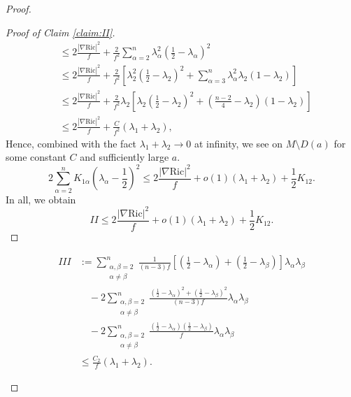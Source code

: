 \documentclass[10pt,a4paper]{amsart}
\begin{document}
\begin{proof}
\begin{proof}[Proof of Claim \ref{claim:II}]
\begin{equation}
\begin{aligned}
			&\leq 2\frac{|\nabla \mathrm{Ric}|^2}{f} + \frac{2}{f^2}\sum_{\alpha=2}^n\lambda_\alpha^2\left(\frac{1}{2} - \lambda_\alpha\right)^2 \\
			&\leq 2\frac{|\nabla \mathrm{Ric}|^2}{f} + \frac{2}{f^2}\left[\lambda_2^2\left(\frac{1}{2} - \lambda_2\right)^2 + \sum_{\alpha=3}^n\lambda_\alpha^2\lambda_2(1-\lambda_2)\right] \\
			&\leq 2\frac{|\nabla \mathrm{Ric}|^2}{f} + \frac{2}{f^2}\lambda_2\left[\lambda_2\left(\frac{1}{2} - \lambda_2\right)^2 + \left(\frac{n-2}{4} - \lambda_2\right)(1-\lambda_2)\right] \\
			&\leq 2\frac{|\nabla \mathrm{Ric}|^2}{f} + \frac{C}{f^2}(\lambda_1+\lambda_2),
		\end{aligned}
	\end{equation}
Hence, combined with the fact $\lambda_1+\lambda_2 \to 0$ at infinity, we see
		on $M \setminus D(a)$ for some constant $C$ and sufficiently large $a$.
		\[
	2\sum_{\alpha=2}^n K_{1\alpha}\left(\lambda_\alpha - \frac{1}{2}\right)^2 \leq 2\frac{|\nabla \mathrm{Ric}|^2}{f} + o(1)(\lambda_1+\lambda_2) + \frac{1}{2}K_{12}.	
		\]%
		In all, we obtain
		\[
		II \leq 2\frac{|\nabla \mathrm{Ric}|^2}{f} + o(1)(\lambda_1+\lambda_2) + \frac{1}{2}K_{12}.
		\]
	\end{proof}
	
	\begin{claim}\label{claim:III}
		\begin{equation*}\label{eq:claim-III}
			\begin{aligned}
				III &:= \sum_{\substack{\alpha,\beta=2 \\ \alpha\neq\beta}}^n \frac{1}{(n-3)f}\left[\left(\frac{1}{2} - \lambda_{\alpha}\right) + \left(\frac{1}{2} - \lambda_{\beta}\right)\right]\lambda_\alpha\lambda_\beta \\
				&\quad - 2\sum_{\substack{\alpha,\beta=2 \\ \alpha\neq\beta}}^n \frac{\left(\frac{1}{2} - \lambda_{\alpha}\right)^2 + \left(\frac{1}{2} - \lambda_{\beta}\right)^2}{(n-3)f}\lambda_\alpha\lambda_\beta \\
				&\quad - 2\sum_{\substack{\alpha,\beta=2 \\ \alpha\neq\beta}}^n \frac{\left(\frac{1}{2} - \lambda_{\alpha}\right)\left(\frac{1}{2} - \lambda_{\beta}\right)}{f}\lambda_\alpha\lambda_\beta \\
				&\leq \frac{C_2}{f}(\lambda_{1}+\lambda_{2}).
			\end{aligned}
		\end{equation*}
	\end{claim}
	

\end{proof}
\end{document}
